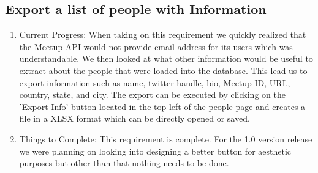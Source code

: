 \documentclass[letterpaper,10pt,onecolumn]{IEEEtran} %
\begin{document}
\subsection{Export a list of people with Information}
\begin{enumerate}[label*=\arabic*.]
\item Current Progress: When taking on this requirement we quickly realized that the Meetup API would not provide email address for its users which was understandable. We then looked at what other information would be useful to extract about the people that were loaded into the database. This lead us to export information such as name, twitter handle, bio, Meetup ID, URL, country, state, and city. The export can be executed by clicking on the 'Export Info' button located in the top left of the people page and creates a file in a XLSX format which can be directly opened or saved.


\item Things to Complete: This requirement is complete. For the 1.0 version release we were planning on looking into designing a better button for aesthetic purposes but other than that nothing needs to be done.

\end{enumerate}
\end{document}
